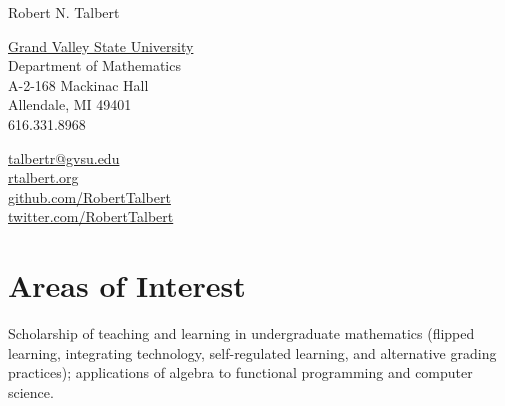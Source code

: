 \documentclass[letterpaper]{article}
\def\name{Robert N. Talbert}
\renewenvironment{itemize}{
  \begin{list}{}{
    \setlength{\leftmargin}{1.5em}
	\setlength{\itemsep}{0in}
  }
}{
  \end{list}
}
\begin{document}
{\Large \name}


\vspace{0.25in}

\begin{minipage}{0.45\linewidth}
  \href{http://www.gvsu.edu/}{Grand Valley State University} \\
  Department of Mathematics \\
  A-2-168 Mackinac Hall \\
  Allendale, MI 49401 \\
  616.331.8968
\end{minipage}
\begin{minipage}{0.45\linewidth}
    \href{mailto:talbertr@gvsu.edu}{talbertr@gvsu.edu} \\
    \href{http://faculty.gvsu.edu/talbertr/}{rtalbert.org} \\
    \href{http://www.github.com}{github.com/RobertTalbert} \\
    \href{http://www.twitter.com/RobertTalbert}{twitter.com/RobertTalbert} \\
\end{minipage}




\section*{Areas of Interest}

\begin{itemize}
  Scholarship of teaching and learning in undergraduate mathematics (flipped learning, integrating technology, self-regulated learning, and alternative grading practices); applications of algebra to functional programming and computer science.
\end{itemize}
\end{document}

